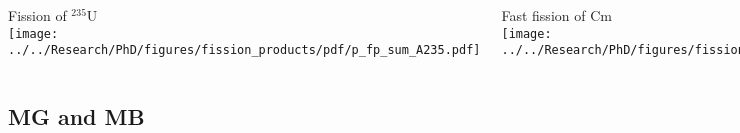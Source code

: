 \documentclass[compress,10pt]{beamer}
\begin{document}
\begin{frame}
\begin{columns}[b]

        \centering

        {\footnotesize Fission of $^{235}$U  } \\
        {}\texttt{[image: ../../Research/PhD/figures/fission\_products/pdf/p\_fp\_sum\_A235.pdf]} \\


        \centering

        {\footnotesize Fast fission of Cm  } \\
        {}\texttt{[image: ../../Research/PhD/figures/fission\_products/pdf/p\_fp\_sum\_Z96\_E2.pdf]} \\


        \centering

        {\footnotesize SF of Cm  } \\
        {}\texttt{[image: ../../Research/PhD/figures/fission\_products/pdf/p\_sf\_sum\_Z96\_E0.pdf]} \\

    \end{columns}

\end{frame}

\subsection{MG and MB}

\typeout{***********************************************************************************}
\end{document}
